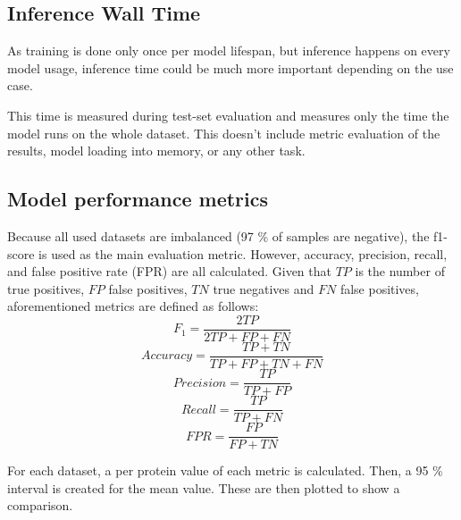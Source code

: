 \subsection{Inference Wall Time}

As training is done only once per model lifespan, but inference happens on every model usage, inference time could be much more important depending on the use case.

This time is measured during test-set evaluation and measures only the time the model runs on the whole dataset. This doesn't include metric evaluation of the results, model loading into memory, or any other task.

\subsection{Model performance metrics}

Because all used datasets are imbalanced (97 \% of samples are negative), the f1-score is used as the main evaluation metric. However, accuracy, precision, recall, and false positive rate (FPR) are all calculated. Given that $TP$ is the number of true positives, $FP$ false positives, $TN$ true negatives and $FN$ false positives, aforementioned metrics are defined as follows:
$$F_1 = \frac{2TP}{2TP + FP + FN}$$
$$Accuracy = \frac{TP + TN}{TP + FP + TN + FN}$$
$$Precision = \frac{TP}{TP + FP}$$
$$Recall = \frac{TP}{TP + FN}$$
$$FPR = \frac{FP}{FP + TN}$$

For each dataset, a per protein value of each metric is calculated. Then, a 95 \% interval is created for the mean value. These are then plotted to show a comparison.